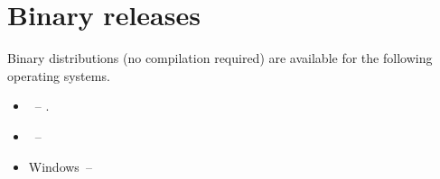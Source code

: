%
%
%


\chapter{Binary releases}\label{chap:bin}

Binary distributions (no compilation required) are available for the following operating systems.
\begin{itemize}
 \item \linux~-- .
 \item \macosx~-- 
 \item Windows~-- 
\end{itemize}


